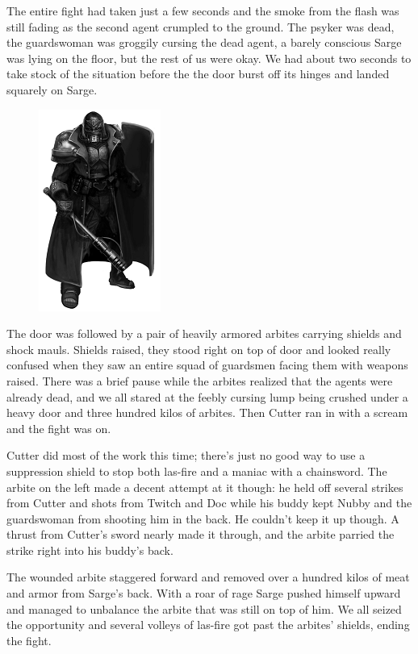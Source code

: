 The entire fight had taken just a few seconds and the smoke from the flash was still fading as the second agent crumpled to the ground. 
The psyker was dead, the guardswoman was groggily cursing the dead agent, a barely conscious Sarge was lying on the floor, but the rest of us were okay. 
We had about two seconds to take stock of the situation before the the door burst off its hinges and landed squarely on Sarge.

\begin{figure}
	\begin{center}
		\includegraphics[width=\figwidth]{pics/5/32.png}
	\end{center}
\end{figure}
The door was followed by a pair of heavily armored arbites carrying shields and shock mauls. 
Shields raised, they stood right on top of door and looked really confused when they saw an entire squad of guardsmen facing them with weapons raised. 
There was a brief pause while the arbites realized that the agents were already dead, and we all stared at the feebly cursing lump being crushed under a heavy door and three hundred kilos of arbites. 
Then Cutter ran in with a scream and the fight was on.

Cutter did most of the work this time; there’s just no good way to use a suppression shield to stop both las-fire and a maniac with a chainsword. 
The arbite on the left made a decent attempt at it though: 
he held off several strikes from Cutter and shots from Twitch and Doc while his buddy kept Nubby and the guardswoman from shooting him in the back. 
He couldn’t keep it up though. 
A thrust from Cutter’s sword nearly made it through, and the arbite parried the strike right into his buddy’s back.

The wounded arbite staggered forward and removed over a hundred kilos of meat and armor from Sarge’s back. 
With a roar of rage Sarge pushed himself upward and managed to unbalance the arbite that was still on top of him. 
We all seized the opportunity and several volleys of las-fire got past the arbites’ shields, ending the fight.


